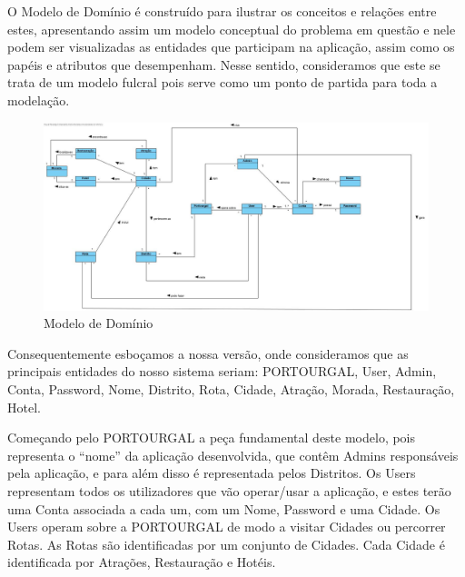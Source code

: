 O Modelo de Domínio é construído para ilustrar os conceitos e relações entre estes, apresentando assim um modelo conceptual do problema em questão e nele podem ser visualizadas as entidades que participam na aplicação, assim como os papéis e atributos que desempenham. Nesse sentido, consideramos que este se trata de um modelo fulcral pois serve como um ponto de partida para toda a modelação.

\begin{figure}[H]
\centering
\includegraphics[width=0.9\linewidth]{images/modelodominio.jpg}
\caption{Modelo de Domínio}
\label{fig:mdominio}
\end{figure}

Consequentemente esboçamos a nossa versão, onde consideramos que as principais entidades do nosso sistema seriam: PORTOURGAL, User, Admin, Conta, Password, Nome, Distrito, Rota, Cidade, Atração, Morada, Restauração, Hotel.

Começando pelo PORTOURGAL a peça fundamental deste modelo, pois representa o “nome” da aplicação desenvolvida, que contêm Admins responsáveis pela aplicação, e para além disso é representada pelos Distritos. Os Users representam todos os utilizadores que vão operar/usar a aplicação, e estes terão uma Conta associada a cada um, com um Nome, Password e uma Cidade. Os Users operam sobre a PORTOURGAL de modo a visitar Cidades ou percorrer Rotas. As Rotas são identificadas por um conjunto de Cidades. Cada Cidade é identificada por Atrações, Restauração e Hotéis.